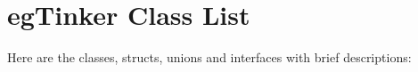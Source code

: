 \section{eg\-Tinker Class List}
Here are the classes, structs, unions and interfaces with brief descriptions:\begin{CompactList}
\item{}
\item{}
\item{}
\end{CompactList}
